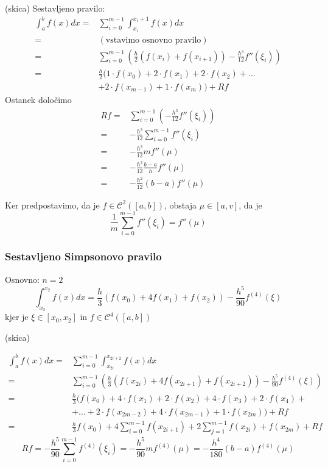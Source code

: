 \documentclass[a4paper,12pt]{article}
\theoremstyle{definition}
\theoremstyle{remark}
\begin{document}
(skica)
Sestavljeno pravilo:
\begin{align*}
    \int_{a}^{b} f(x) dx =& \sum_{i=0}^{m-1} \int_{x_i}^{x_i+1} f(x) dx \\
                         =& (\text{vstavimo osnovno pravilo}) \\
                         =& \sum_{i=0}^{m-1} (\frac{h}{2} (f(x_i) + f(x_{i+1})) - \frac{h^3}{12} f''(\xi_i)) \\
                         =& \frac{h}{2}(1 \cdot f(x_0) + 2 \cdot f(x_1) + 2 \cdot f(x_2) + \dots \\
                         &+ 2 \cdot f(x_{m-1}) + 1 \cdot f(x_m)) + Rf
\end{align*}
Ostanek določimo
\begin{align*}
    Rf =& \sum_{i=0}^{m-1} (- \frac{h^3}{12} f''(\xi_i)) \\
       =& - \frac{h^3}{12} \sum_{i=0}^{m-1} f''(\xi_i) \\
       =& - \frac{h^3}{12} m f''(\mu) \\
       =& -\frac{h^3}{12} \frac{b-a}{h} f''(\mu) \\
       =& -\frac{h^2}{12} (b-a) f''(\mu)
\end{align*}

Ker predpostavimo, da je $f \in \mathscr{C}^2 ([a, b])$, obstaja $\mu \in [a, v]$, da je
\begin{equation*}
    \frac{1}{m} \sum_{i=0}^{m-1} f''(\xi_i) = f''(\mu)
\end{equation*}



\subsubsection{Sestavljeno Simpsonovo pravilo}
Osnovno: $n=2$
\begin{equation*}
    \int_{x_0}^{x_2} f(x) dx = \frac{h}{3} (f(x_0) + 4f(x_1) + f(x_2)) - \frac{h^5}{90} f^{(4)}(\xi)
\end{equation*}
kjer je $\xi \in [x_0, x_2]$ in $f \in \mathscr{C}^4([a, b])$

(skica)

\begin{align*}
    \int_{a}^{b} f(x) dx =& \sum_{i = 0}^{m-1} \int_{x_{2i}}^{x_{2i+2}} f(x) dx \\
                         =& \sum_{i=0}^{m-1} (\frac{h}{3} (f(x_{2i}) + 4f(x_{2i+1}) + f(x_{2i+2})) - \frac{h^5}{90} f^{(4)}(\xi)) \\
                         =& \frac{h}{3} (f(x_0) + 4 \cdot f(x_1) +2 \cdot f(x_2) + 4 \cdot f(x_3) + 2\cdot f(x_4) + \\
                         &+ \dots + 2 \cdot f(x_{2m-2}) + 4 \cdot f(x_{2m-1}) + 1 \cdot f(x_{2m})) + Rf \\
                         =& \frac{h}{3} f(x_0) + 4 \sum_{i=0}^{m-1} f(x_{2i+1}) + 2 \sum_{j = 1}^{m-1} f(x_{2i}) + f(x_{2m}) + Rf
\end{align*}
\begin{equation*}
    Rf = - \frac{h^5}{90} \sum_{i=0}^{m-1} f^{(4)} (\xi_i) = - \frac{h^5}{90} m f^{(4)}(\mu) = - \frac{h^4}{180} (b-a) f^{(4)} (\mu)
\end{equation*}
\end{document}
